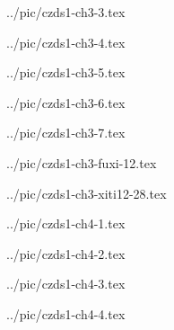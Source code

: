 ../pic/czds1-ch3-3.tex



../pic/czds1-ch3-4.tex



../pic/czds1-ch3-5.tex



../pic/czds1-ch3-6.tex



../pic/czds1-ch3-7.tex



../pic/czds1-ch3-fuxi-12.tex



../pic/czds1-ch3-xiti12-28.tex



../pic/czds1-ch4-1.tex



../pic/czds1-ch4-2.tex



../pic/czds1-ch4-3.tex



../pic/czds1-ch4-4.tex

